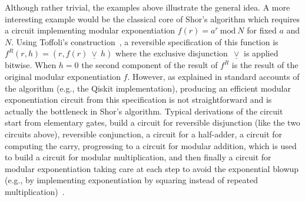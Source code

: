 Although rather trivial, the examples above illustrate the general idea. A more interesting example would be the
classical core of Shor's algorithm which requires a circuit implementing modular exponentiation $f(r) =
a^{r}~\mathrm{mod}~N$ for fixed $a$ and $N$. Using Toffoli's construction~\citeyearpar{toffoliReversibleComputing1980},
a reversible specification of this function is $f^R(r,h) = (r, f(r)~\underline{\vee}~ h)$ where the exclusive
disjunction~$\underline{\vee}$ is applied bitwise. When $h=0$ the second component of the result of $f^R$ is the result
of the original modular exponentiation $f$.
However, as explained in standard accounts of the algorithm (e.g., the Qiskit implementation), producing an efficient
modular exponentiation circuit from this specification is not straightforward and is actually the bottleneck in Shor’s
algorithm. Typical derivations of the circuit start from elementary gates, build a circuit for reversible disjunction
(like the two circuits above), reversible conjunction, a circuit for a half-adder, a circuit for computing the carry,
progressing to a circuit for modular addition, which is used to build a circuit for modular multiplication, and then
finally a circuit for modular exponentiation taking care at each step to avoid the exponential blowup (e.g., by
implementing exponentiation by squaring instead of repeated multiplication)~\cite{beauregardCircuitShorAlgorithm2003}.


